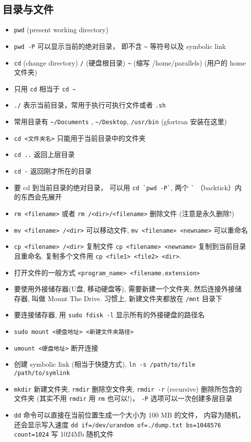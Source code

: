 \subsection{目录与文件}
\begin{itemize}
\item \verb`pwd` (present working directory)
\item \verb`pwd -P` 可以显示当前的绝对目录， 即不含 \verb`~` 等符号以及 symbolic link
\item \verb`cd` (change directory) \verb`/` (硬盘根目录) \verb`~` (缩写 /home/parallels) (用户的 home 文件夹)
\item 只用 \verb`cd` 相当于 \verb`cd ~`
\item \verb`./` 表示当前目录，常用于执行可执行文件或者 \verb`.sh`
\item 常用目录有 \verb`~/Documents` ,  \verb`~/Desktop`, \verb`/usr/bin` (gfortran 安装在这里)
\item \verb`cd <文件夹名>` 只能用于当前目录中的文件夹
\item \verb`cd ..` 返回上层目录
\item \verb`cd -` 返回刚才所在的目录
\item 要 cd 到当前目录的绝对目录， 可以用 \verb|cd `pwd -P`|, 两个 \verb|`| （backtick）内的东西会先展开
\item \verb`rm <filename>` 或者 \verb`rm /<dir>/<filename>` 删除文件  (注意是永久删除!)
\item \verb`mv <filename> /<dir>` 可以移动文件, \verb`mv <filename> <newname>` 可以重命名
\item \verb`cp <filename> /<dir>` 复制文件 \verb`cp <filename> <newname>` 复制到当前目录且重命名. 复制多个文件用 \verb`cp <file1> <file2> <dir>`.
\item 打开文件的一般方式 \verb`<program_name> <filename.extension>`
\item 要使用外接储存器(U盘, 移动硬盘等), 需要新建一个文件夹, 然后连接外接储存器, 叫做 Mount The Drive. 习惯上, 新建文件夹都放在 \verb`/mnt` 目录下
\item 要连接储存器, 用 \verb`sudo fdisk -l` 显示所有的外接硬盘的路径名
\item \verb`sudo mount <硬盘地址> <新建文件夹路径>`
\item \verb`umount <硬盘地址>` 断开连接
\item 创建 symbolic link (相当于快捷方式), \verb`ln -s /path/to/file /path/to/symlink`
\item \verb`mkdir` 新建文件夹, \verb`rmdir` 删除空文件夹, \verb`rmdir -r` (recursive) 删除所包含的文件夹 (其实不用 \verb`rmdir` 用 \verb`rm` 也可以!)， \verb`-P` 选项可以一次创建多层目录
\item \verb`dd` 命令可以直接在当前位置生成一个大小为 100 MB 的文件， 内容为随机， 还会显示写入速度
\verb`dd if=/dev/urandom of=./dump.txt bs=1048576 count=1024` 写 1024Mb 随机文件
\end{itemize}

